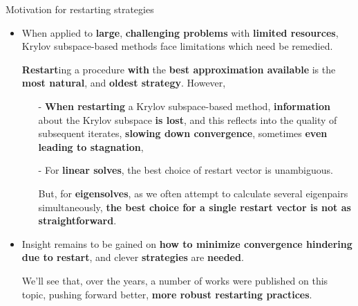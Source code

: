 \documentclass[t,usepdftitle=false]{beamer}
\begin{document}
\begin{frame}{Motivation for restarting strategies}
\begin{itemize}
\item When applied to \textbf{large}, \textbf{challenging problems} with \textbf{limited resources}, Krylov subspace-based  methods face limitations which need be remedied.
\item[] \textbf{Restart}ing a procedure \textbf{with} the \textbf{best approximation available} is the \textbf{most natural}, and \textbf{oldest strategy}.
However,
\begin{itemize}\normalsize
\item[-] \textbf{When restarting} a Krylov subspace-based method, \textbf{information} about the Krylov subspace \textbf{is lost}, and this reflects into the quality of subsequent iterates, \textbf{slowing down convergence}, sometimes \textbf{even leading to stagnation},
\item[-] For \textbf{linear solves}, the best choice of restart vector is unambiguous.
\item[] But, for \textbf{eigensolves}, as we often attempt to calculate several eigenpairs simultaneously, \textbf{the best choice for a single restart vector is not as straightforward}.
\end{itemize}
\item Insight remains to be gained on \textbf{how to minimize convergence hindering due to restart}, and clever \textbf{strategies} are \textbf{needed}.
\item[] We'll see that, over the years, a number of works were published on this topic, pushing forward better, \textbf{more robust restarting practices}.
\end{itemize}
\end{frame}
\end{document}

